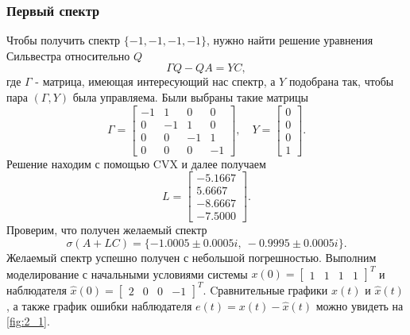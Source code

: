 \subsubsection{Первый спектр}

Чтобы получить спектр $\{-1, -1, -1, -1\}$, нужно найти решение уравнения Сильвестра
относительно $Q$
\begin{equation*}
    \Gamma Q-QA=YC,
\end{equation*}
где $\Gamma$ - матрица, имеющая интересующий нас спектр, а $Y$ подобрана так, чтобы
пара $(\Gamma, Y)$ была управляема. Были выбраны такие матрицы
\begin{equation*}
    \Gamma=\begin{bmatrix}
        -1&  1&  0&  0\\
        0& -1&  1&  0\\
        0&  0& -1&  1\\
        0&  0&  0& -1
    \end{bmatrix},\quad
    Y=\begin{bmatrix}
        0\\ 0\\ 0\\ 1
    \end{bmatrix}.
\end{equation*}
Решение находим с помощью CVX и далее получаем
\begin{equation*}
    L=\begin{bmatrix}
        -5.1667\\
5.6667\\
-8.6667\\
-7.5000
    \end{bmatrix}.
\end{equation*}
Проверим, что получен желаемый спектр
\begin{equation*}
    \sigma(A+LC)=\{-1.0005\pm 0.0005i,\ -0.9995\pm 0.0005i\}.
\end{equation*}
Желаемый спектр успешно получен с небольшой погрешностью.
Выполним моделирование с начальными условиями системы 
$x(0) = \begin{bmatrix}
    1 & 1 & 1 & 1
\end{bmatrix}^T$ и наблюдателя $\hat x(0) = \begin{bmatrix}
    2 & 0 & 0 & -1
\end{bmatrix}^T$. Cравнительные графики $x(t)$ и $\hat x(t)$, 
а также график ошибки наблюдателя $e(t) = x(t) -\hat x(t)$
можно увидеть на \autoref{fig:2_1}.

